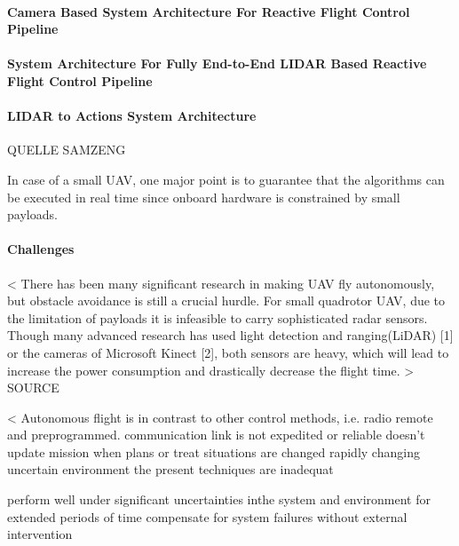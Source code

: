 \paragraph{Camera Based System Architecture For Reactive Flight Control Pipeline}

\paragraph{System Architecture For Fully End-to-End LIDAR Based Reactive Flight Control
Pipeline}


\paragraph{LIDAR to Actions System Architecture}

QUELLE SAMZENG

In case of a small UAV,
one major point is to
guarantee that the algorithms
can be executed in real time
since onboard hardware is constrained
by small payloads.



\paragraph{Challenges}





<
There  has  been  many  significant  research  in  making  UAV  fly  autonomously,  but  obstacle  avoidance  is  still  a  crucial   hurdle.   For   small   quadrotor   UAV,   due   to   the   limitation  of  payloads  it  is  infeasible  to  carry  sophisticated  radar  sensors.  Though  many  advanced  research  has  used  light  detection  and  ranging(LiDAR)  [1]  or  the  cameras  of  Microsoft Kinect [2], both sensors are heavy, which will lead to  increase  the  power  consumption  and  drastically  decrease  the flight time.
>
SOURCE 

<
Autonomous flight is in contrast to other
control methods, i.e. radio remote and preprogrammed.
    communication  link  is  not  expedited  or  reliable
    doesn’t  update  mission  when  plans  or  treat  situations  are  changed
    rapidly  changing  uncertain  environment the present techniques are inadequat

perform  well  under  significant  uncertainties  inthe  system  and  environment for extended periods of time
compensate  for  system  failures  without  external  intervention

